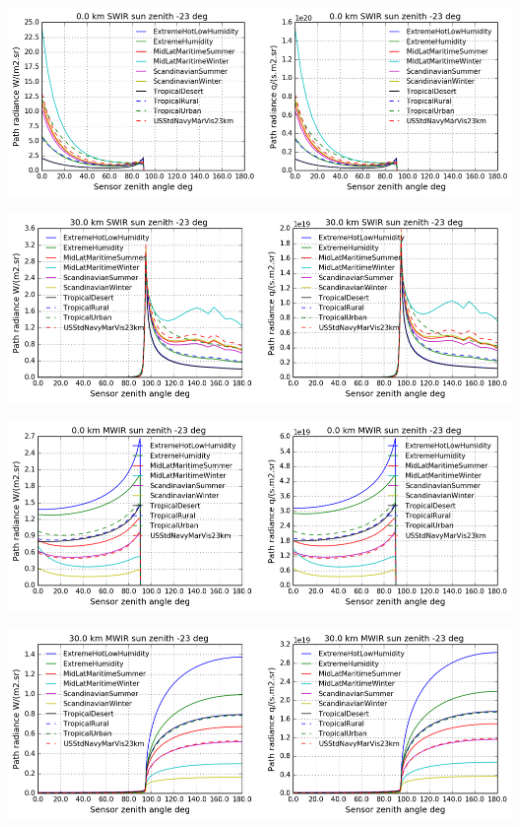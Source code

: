 \documentclass{workpackage}
\begin{document}
\begin{center}
\includegraphics{./pic/Analyse-Standard-Atmospheres_42_4.png}
\end{center}

\begin{center}
\includegraphics{./pic/Analyse-Standard-Atmospheres_42_5.png}
\end{center}

\begin{center}
\includegraphics{./pic/Analyse-Standard-Atmospheres_42_6.png}
\end{center}

\begin{center}
\includegraphics{./pic/Analyse-Standard-Atmospheres_42_7.png}
\end{center}
\end{document}
